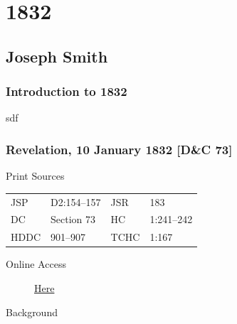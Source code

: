 \section{1832}
	\label{EMS-1832}
	
	\subsection{Joseph Smith}
		\label{EMS-1832-JS}
		
		\subsubsection{Introduction to 1832}
		
			sdf
			
		\subsubsection{Revelation, 10 January 1832 [D\&C 73]}
			\label{EMS-1832-JS-10-JAN-1832}
		
			\begin{description}
				\item[Print Sources]
			\end{description}

				\begin{tabular}{p{0.5in}p{1in}p{0.5in}p{1in}}
				JSP	 	& D2:154--157	& JSR 		& 183 \\
				DC	 	& Section 73 	& HC 		& 1:241--242 \\
				HDDC 	& 901--907		& TCHC 		& 1:167 \\
				\end{tabular}
			
			\begin{description}
				\item[Online Access] \href{https://www.josephsmithpapers.org/paper-summary/revelation-10-january-1832-dc-73/1}{Here}
			\end{description}
			
			\begin{description}
				\item[Background]
			\end{description}
			
